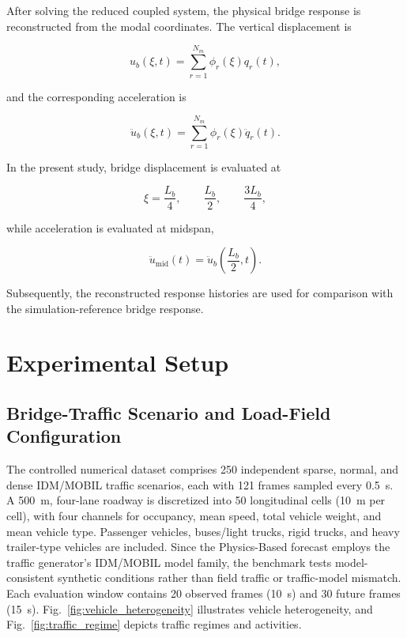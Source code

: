 \documentclass[journal]{IEEEtran}
\begin{document}
After solving the reduced coupled system, the physical bridge
response is reconstructed from the modal coordinates. The vertical displacement
is

\begin{equation}
u_b(\xi,t)
=
\sum_{r=1}^{N_m}
\phi_r(\xi)q_r(t),
\end{equation}

and the corresponding acceleration is

\begin{equation}
\ddot{u}_b(\xi,t)
=
\sum_{r=1}^{N_m}
\phi_r(\xi)\ddot{q}_r(t).
\end{equation}

In the present study, bridge displacement is evaluated at

\begin{equation}
\xi
=
\frac{L_b}{4},
\qquad
\frac{L_b}{2},
\qquad
\frac{3L_b}{4},
\end{equation}

while acceleration is evaluated at midspan,

\begin{equation}
\ddot{u}_{\mathrm{mid}}(t)
=
\ddot{u}_b
\left(
\frac{L_b}{2},t
\right).
\end{equation}

Subsequently, the reconstructed response histories are used for comparison with the simulation-reference bridge response.




\section{Experimental Setup}

\subsection{Bridge-Traffic Scenario and Load-Field Configuration}

The controlled numerical dataset comprises 250 independent sparse, normal, and dense IDM/MOBIL traffic scenarios, each with 121 frames sampled every 0.5~s. A 500~m, four-lane roadway is discretized into 50 longitudinal cells (10~m per cell), with four channels for occupancy, mean speed, total vehicle weight, and mean vehicle type. Passenger vehicles, buses/light trucks, rigid trucks, and heavy trailer-type vehicles are included. Since the Physics-Based forecast employs the traffic generator's IDM/MOBIL model family, the benchmark tests model-consistent synthetic conditions rather than field traffic or traffic-model mismatch. Each evaluation window contains 20 observed frames (10~s) and 30 future frames (15~s). Fig.~\ref{fig:vehicle_heterogeneity} illustrates vehicle heterogeneity, and Fig.~\ref{fig:traffic_regime} depicts traffic regimes and activities.
\end{document}
